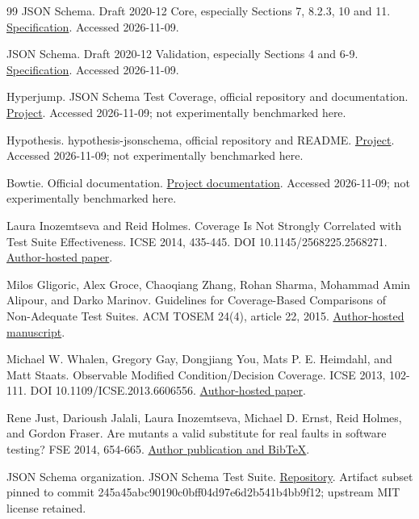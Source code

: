 \documentclass[sigconf,nonacm]{acmart}
\begin{document}
\begin{thebibliography}{99}
 JSON Schema. Draft 2020-12 Core, especially Sections 7, 8.2.3, 10 and 11. \href{https://json-schema.org/draft/2020-12/json-schema-core}{Specification}. Accessed 2026-11-09.

 JSON Schema. Draft 2020-12 Validation, especially Sections 4 and 6-9. \href{https://json-schema.org/draft/2020-12/json-schema-validation}{Specification}. Accessed 2026-11-09.

 Hyperjump. JSON Schema Test Coverage, official repository and documentation. \href{https://github.com/hyperjump-io/json-schema-coverage/}{Project}. Accessed 2026-11-09; not experimentally benchmarked here.

 Hypothesis. hypothesis-jsonschema, official repository and README. \href{https://github.com/python-jsonschema/hypothesis-jsonschema}{Project}. Accessed 2026-11-09; not experimentally benchmarked here.

 Bowtie. Official documentation. \href{https://docs.bowtie.report/en/stable/}{Project documentation}. Accessed 2026-11-09; not experimentally benchmarked here.

 Laura Inozemtseva and Reid Holmes. Coverage Is Not Strongly Correlated with Test Suite Effectiveness. ICSE 2014, 435-445. DOI 10.1145/2568225.2568271. \href{https://www.cs.ubc.ca/~rtholmes/papers/icse_2014_inozemtseva.pdf}{Author-hosted paper}.

 Milos Gligoric, Alex Groce, Chaoqiang Zhang, Rohan Sharma, Mohammad Amin Alipour, and Darko Marinov. Guidelines for Coverage-Based Comparisons of Non-Adequate Test Suites. ACM TOSEM 24(4), article 22, 2015. \href{https://mir.cs.illinois.edu/marinov/publications/GligoricETAL15CoCoJournal.pdf}{Author-hosted manuscript}.

 Michael W. Whalen, Gregory Gay, Dongjiang You, Mats P. E. Heimdahl, and Matt Staats. Observable Modified Condition/Decision Coverage. ICSE 2013, 102-111. DOI 10.1109/ICSE.2013.6606556. \href{https://greg4cr.github.io/pdf/13omcdc.pdf}{Author-hosted paper}.

 Rene Just, Darioush Jalali, Laura Inozemtseva, Michael D. Ernst, Reid Holmes, and Gordon Fraser. Are mutants a valid substitute for real faults in software testing? FSE 2014, 654-665. \href{https://homes.cs.washington.edu/~mernst/pubs/mutation-effectiveness-fse2014-abstract.html}{Author publication and BibTeX}.

 JSON Schema organization. JSON Schema Test Suite. \href{https://github.com/json-schema-org/JSON-Schema-Test-Suite}{Repository}. Artifact subset pinned to commit 245a45abc90190c0bff04d97e6d2b541b4bb9f12; upstream MIT license retained.


\end{thebibliography}
\end{document}
